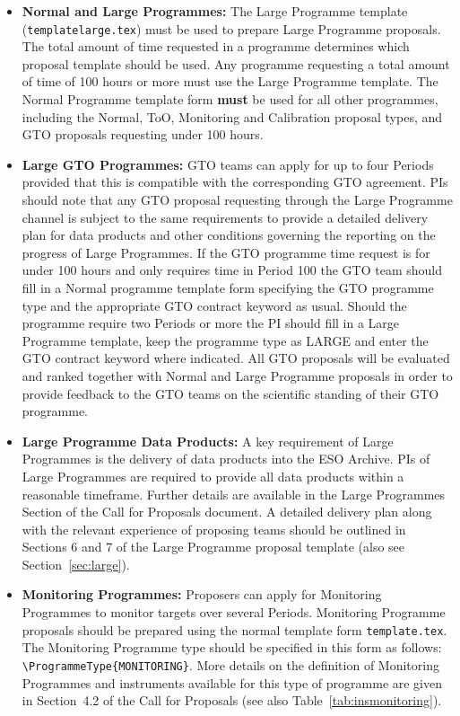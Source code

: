 \documentclass{article}
\begin{document}
\begin{itemize}

\item{\bf Normal and Large Programmes:}
The Large Programme template ({\tt templatelarge.tex}) must be used to
prepare Large Programme proposals. The total amount of time requested in a programme determines which proposal template should be used.
Any programme requesting a total amount of time of 100 hours or more
must use the Large Programme template.
The Normal Programme template form {\bf must} be used for all other programmes,
including the Normal, ToO, Monitoring and Calibration proposal types, and GTO proposals
requesting under 100 hours.

\item{\bf Large GTO Programmes:} 
GTO teams can apply for up to four Periods provided that this is compatible with the corresponding GTO agreement.
PIs should note that any GTO proposal requesting through the Large Programme channel is subject to the same requirements to provide a detailed delivery plan for data products and other conditions governing the reporting on the progress of Large Programmes.
If the GTO programme time request is for under 100 hours and only requires time in Period 100 the GTO team should fill in a Normal programme template form specifying the GTO programme type and the appropriate GTO contract keyword as usual. 
Should the programme require two Periods or more the PI should fill in a Large Programme template,
keep the programme type as LARGE and enter the GTO contract keyword where indicated.
All GTO proposals will be evaluated and ranked together with Normal and Large Programme proposals in order to provide feedback to the GTO teams on the scientific standing of their GTO programme.

\item{\bf Large Programme Data Products:}
A key requirement of Large Programmes is the delivery of data products into the ESO Archive. PIs of Large Programmes are required to provide all data products within a reasonable timeframe. Further details are available in the Large Programmes Section of the Call for Proposals document.
A detailed delivery plan along with the relevant experience of proposing teams
should be outlined in Sections 6 and 7 of the Large Programme proposal template
(also see Section~\ref{sec:large}).

\item{\bf Monitoring Programmes:}  
Proposers can apply for Monitoring Programmes to monitor targets over several Periods.  
Monitoring Programme proposals should be prepared using the normal template form \verb|template.tex|. The Monitoring Programme type should be specified in this form as follows: \linebreak\verb|\ProgrammeType{MONITORING}|. More details on the definition of Monitoring Programmes and instruments available for this type of programme are given in Section~4.2 of the Call for Proposals (see also Table~\ref{tab:insmonitoring}).


\end{itemize}
\end{document}
